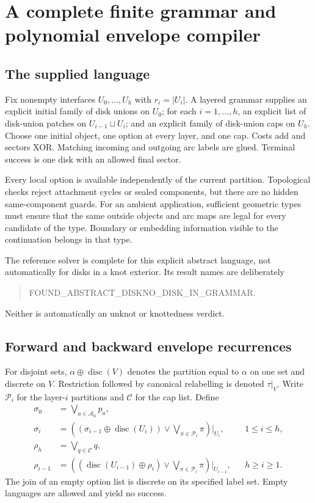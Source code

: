 \documentclass[11pt,a4paper]{article}
\theoremstyle{definition}
\theoremstyle{remark}
\begin{document}
\section{A complete finite grammar and polynomial envelope compiler}\label{sec:grammar}
\subsection{The supplied language}
Fix nonempty interfaces $U_0,\ldots,U_h$ with $r_i=|U_i|$. A layered grammar supplies an
explicit initial family of disk unions on $U_0$; for each $i=1,\ldots,h$, an explicit
list of disk-union patches on $U_{i-1}\sqcup U_i$; and an explicit family of disk-union
caps on $U_h$. Choose one initial object, one option at every layer, and one cap.
Costs add and sectors XOR. Matching incoming and outgoing arc labels are glued.
Terminal success is one disk with an allowed final sector.

Every local option is available independently of the current partition. Topological
checks reject attachment cycles or sealed components, but there are no hidden
same-component guards. For an ambient application, sufficient geometric types must
ensure that the same outside objects and arc maps are legal for every candidate of the
type. Boundary or embedding information visible to the continuation belongs in that type.

The reference solver is complete for this explicit abstract language, not automatically
for disks in a knot exterior. Its result names are deliberately
\begin{quote}\ttfamily
FOUND\_ABSTRACT\_DISK\qquad NO\_DISK\_IN\_GRAMMAR.
\end{quote}
Neither is automatically an unknot or knottedness verdict.

\subsection{Forward and backward envelope recurrences}
For disjoint sets, $\alpha\oplus\operatorname{disc}(V)$ denotes the partition equal to
$\alpha$ on one set and discrete on $V$. Restriction followed by canonical relabelling
is denoted $\tau|_V$. Write $\mathcal P_i$ for the layer-$i$ partitions and $\mathcal C$
for the cap list. Define
\begin{align}
 \sigma_0&=\bigvee_{a\in\mathcal A_0}p_a,\label{eq:forward0}\\
 \sigma_i&=\left((\sigma_{i-1}\oplus\operatorname{disc}(U_i))
            \vee\bigvee_{\pi\in\mathcal P_i}\pi\right)\big|_{U_i},
            &&1\le i\le h,\label{eq:forward}\\
 \rho_h&=\bigvee_{q\in\mathcal C}q,\label{eq:back0}\\
 \rho_{i-1}&=\left((\operatorname{disc}(U_{i-1})\oplus\rho_i)
            \vee\bigvee_{\pi\in\mathcal P_i}\pi\right)\big|_{U_{i-1}},
            &&h\ge i\ge1.\label{eq:backward}
\end{align}
The join of an empty option list is discrete on its specified label set. Empty languages
are allowed and yield no success.
\end{document}
